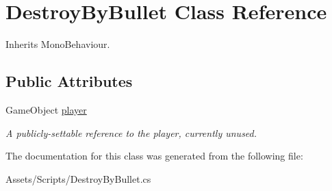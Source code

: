 \hypertarget{class_destroy_by_bullet}{}\section{Destroy\+By\+Bullet Class Reference}
\label{class_destroy_by_bullet}


Inherits Mono\+Behaviour.

\subsection*{Public Attributes}
\begin{DoxyCompactItemize}
\item 
\mbox{\label{class_destroy_by_bullet_ac3225ab3c49d644840b85519aed90623}} 
Game\+Object \mbox{\hyperlink{class_destroy_by_bullet_ac3225ab3c49d644840b85519aed90623}{player}}
\begin{DoxyCompactList}\small\item\em A publicly-\/settable reference to the player, currently unused. \end{DoxyCompactList}\end{DoxyCompactItemize}


The documentation for this class was generated from the following file\+:\begin{DoxyCompactItemize}
\item 
Assets/\+Scripts/Destroy\+By\+Bullet.\+cs\end{DoxyCompactItemize}

